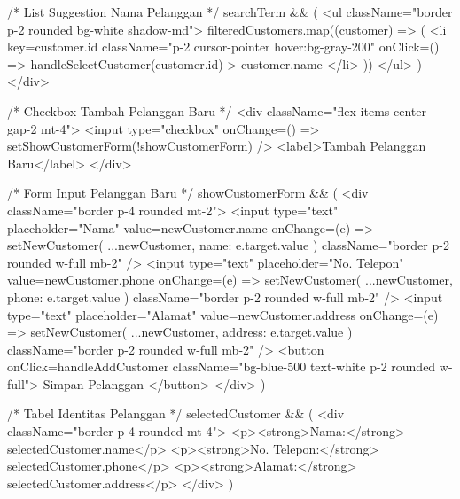 {{                  {/* List Suggestion Nama Pelanggan */}
                  {searchTerm && (
                    <ul className="border p-2 rounded bg-white shadow-md">
                      {filteredCustomers.map((customer) => (
                        <li
                          key={customer.id}
                          className="p-2 cursor-pointer hover:bg-gray-200"
                          onClick={() => handleSelectCustomer(customer.id)}
                        >
                          {customer.name}
                        </li>
                      ))}
                    </ul>
                  )}
                  </div>
                  
                  {/* Checkbox Tambah Pelanggan Baru */}
                  <div className="flex items-center gap-2 mt-4">
                    <input type="checkbox" onChange={() => setShowCustomerForm(!showCustomerForm)} />
                    <label>Tambah Pelanggan Baru</label>
                  </div>

                  {/* Form Input Pelanggan Baru */}
                  {showCustomerForm && (
                    <div className="border p-4 rounded mt-2">
                      <input
                        type="text"
                        placeholder="Nama"
                        value={newCustomer.name}
                        onChange={(e) => setNewCustomer({ ...newCustomer, name: e.target.value })}
                        className="border p-2 rounded w-full mb-2"
                      />
                      <input
                        type="text"
                        placeholder="No. Telepon"
                        value={newCustomer.phone}
                        onChange={(e) => setNewCustomer({ ...newCustomer, phone: e.target.value })}
                        className="border p-2 rounded w-full mb-2"
                      />
                      <input
                        type="text"
                        placeholder="Alamat"
                        value={newCustomer.address}
                        onChange={(e) => setNewCustomer({ ...newCustomer, address: e.target.value })}
                        className="border p-2 rounded w-full mb-2"
                      />
                      <button onClick={handleAddCustomer} className="bg-blue-500 text-white p-2 rounded w-full">
                        Simpan Pelanggan
                      </button>
                    </div>
                  )}

                  {/* Tabel Identitas Pelanggan */}
                  {selectedCustomer && (
                    <div className="border p-4 rounded mt-4">
                      <p><strong>Nama:</strong> {selectedCustomer.name}</p>
                      <p><strong>No. Telepon:</strong> {selectedCustomer.phone}</p>
                      <p><strong>Alamat:</strong> {selectedCustomer.address}</p>
                    </div>
                  )} 

}}
